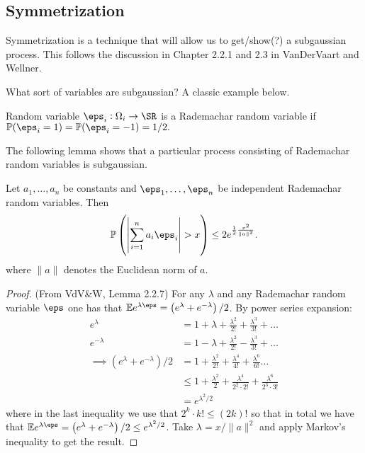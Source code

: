 \subsection{Symmetrization}%
\label{subsec:symmetrization}

Symmetrization is a technique that will allow us to get/show(?) a subgaussian process. This follows the discussion in Chapter 2.2.1 and 2.3 in VanDerVaart and Wellner.

What sort of variables are subgaussian? A classic example below.

\begin{definition}
	\label{def:rademachar}
	Random variable \(\eps_i:\Omega_i\to\SR\) is a Rademachar random variable if
	\(\P(\eps_i=1)=\P(\eps_i=-1)=1/2.\) 
\end{definition}

The following lemma shows that a particular process consisting of Rademachar random variables is subgaussian.

\begin{lemma}
	\label{lemma:hoeffding}
	Let \(a_1,\dots,a_n\) be constants and \(\eps_1,\dots,\eps_n\) be independent Rademachar random variables. Then 
	\[
		\P\left(\left|\sum_{i=1}^n a_i\eps_i\right| > x\right) \leq 2e^{\frac{1}{2}\frac{x^2}{\|a\|^2}  }
	.\] 
	where \(\|a\|\) denotes the Euclidean norm of \(a\).
\end{lemma}
\begin{proof}
	(From VdV\&W, Lemma 2.2.7) For any \(\lambda\) and any Rademachar random variable \(\eps\) one has that  \(\E e^{\lambda\eps} = \left(e^\lambda+e^{-\lambda}\right)/2\). By power series expansion:
	\begin{align*}
		e^\lambda &= 1 + \lambda + \frac{\lambda^2}{2!} + \frac{\lambda^3}{3!} +\dots \\ 
		e^{-\lambda} &= 1 - \lambda + \frac{\lambda^2}{2!} - \frac{\lambda^3}{3!}+\dots \\
		\implies \left(e^{\lambda} + e^{-\lambda}\right)/2 &= 1 + \frac{\lambda^2}{2!} + \frac{\lambda^4}{4!} + \frac{\lambda^6}{6!} \dots \\
														 &\leq 1 + \frac{\lambda^2}{2} + \frac{\lambda^4}{2^2\cdot2!} + \frac{\lambda^6}{2^3\cdot3!}   \\
														 &= e^{\lambda^2/2}
	\end{align*}
	where in the last inequality we use that \(2^k\cdot k! \leq (2k)!\) so that in total we have that \(\E e^{\lambda\eps} = \left(e^\lambda + e^{-\lambda}\right)/2 \leq e^{\lambda^2/2}\). Take \(\lambda = x/\|a\|^2\) and apply Markov's inequality to get the result.
\end{proof}

